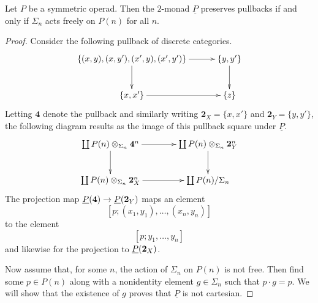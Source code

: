 \begin{prop}\label{prop:P-2cart}
Let $P$ be a symmetric operad. Then the $2$-monad $\underline{P}$ preserves pullbacks if and only if $\Sigma_{n}$ acts freely on $P(n)$ for all $n$.
\end{prop}
\begin{proof}
Consider the following pullback of discrete categories.
    \[
        \xy
            (0,0)*+{\lbrace (x,y), (x,y'), (x',y), (x',y') \rbrace}="00";
            (40,0)*+{\lbrace y,y' \rbrace}="10";
            (0,-15)*+{\lbrace x, x' \rbrace}="01";
            (40,-15)*+{\lbrace z \rbrace}="11";
            {\ar "00" ; "10"};
            {\ar "10" ; "11"};
            {\ar "00" ; "01"};
            {\ar "01" ; "11"};
        \endxy
    \]
Letting $\mathbf{4}$ denote the pullback and similarly writing $\mathbf{2}_X = \{ x, x' \}$ and $\mathbf{2}_Y = \{y, y'\}$, the following diagram results as the image of this pullback square under $\underline{P}$.
    \[
        \xy
            (0,0)*+{\coprod \coeqsig{P}{\mathbf{4}}{n}}="00";
            (40,0)*+{\coprod \coeqsig{P}{\mathbf{2}_Y}{n}}="10";
            (0,-15)*+{\coprod \coeqsig{P}{\mathbf{2}_X}{n}}="01";
            (40,-15)*+{\coprod P(n)/\Sigma_n}="11";
            {\ar "00" ; "10"};
            {\ar "10" ; "11"};
            {\ar "00" ; "01"};
            {\ar "01" ; "11"}:
        \endxy
    \]
The projection map $\underline{P}(\mathbf{4}) \rightarrow \underline{P}(\mathbf{2}_Y)$ maps an element
    \[
        [p;(x_1,y_1), \ldots, (x_n,y_n)]
    \]
to the element
    \[
        [p;y_1,\ldots,y_n]
    \]
and likewise for the projection to $\underline{P}(\mathbf{2}_X)$.

Now assume that, for some $n$, the action of $\Sigma_n$ on $P(n)$ is not free. Then find some $p \in P(n)$ along with a nonidentity element $g \in \Sigma_n$ such that $p \cdot g = p$. We will show that the existence of $g$ proves that $\underline{P}$ is not cartesian.


\end{proof}
